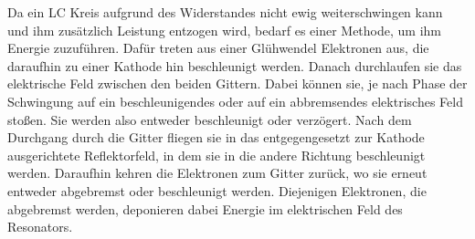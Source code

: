 Da ein LC Kreis aufgrund des Widerstandes nicht ewig weiterschwingen kann und ihm
zusätzlich Leistung entzogen wird, bedarf es einer Methode, um ihm Energie zuzuführen.
Dafür treten aus einer Glühwendel Elektronen aus, die daraufhin zu einer Kathode hin
beschleunigt werden. Danach durchlaufen sie das elektrische Feld zwischen den beiden
Gittern. Dabei können sie, je nach Phase der Schwingung auf ein beschleunigendes
oder auf ein abbremsendes elektrisches Feld stoßen. Sie werden also entweder beschleunigt
oder verzögert. Nach dem Durchgang durch die Gitter fliegen sie in das entgegengesetzt
zur Kathode ausgerichtete Reflektorfeld, in dem sie in die andere Richtung beschleunigt
werden. Daraufhin kehren die Elektronen zum Gitter zurück, wo sie erneut entweder
abgebremst oder beschleunigt werden. Diejenigen Elektronen, die abgebremst werden,
deponieren dabei Energie im elektrischen Feld des Resonators.
